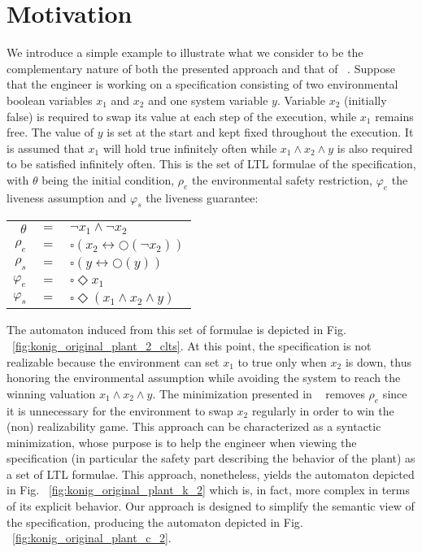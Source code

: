 \clearpage
\section{Motivation}\label{sec:motivation}

We introduce a simple example to illustrate what we consider to be the complementary nature 
of both the presented approach and that of ~\cite{DBLP:conf/hvc/KonighoferHB10}. Suppose that the engineer is working on a specification consisting of two environmental boolean variables $x_1$ and $x_2$ and one system variable $y$. Variable $x_2$ (initially false) is required to swap its value at each step of the execution, while $x_1$ remains free. The value of $y$ is set at the start and kept fixed throughout the execution.
It is assumed that $x_1$ will hold true infinitely often while $x_1 \wedge x_2 \wedge y$ is also required to be satisfied infinitely often. This is the set of LTL formulae of the specification, with $\theta$ being the initial condition, $\rho_e$ the environmental safety restriction, $\varphi_e$ the liveness assumption and $\varphi_s$ the liveness guarantee:
\begin{center}
	\begin{tabular}{ r c l }
		$\theta$& $=$ &$\neg x_1 \wedge \neg x_2$\\
		$\rho_e$& $=$ &$\square(x_2 \leftrightarrow \bigcirc(\neg x_2))$\\
		$\rho_s$& $=$ &$\square(y \leftrightarrow \bigcirc(y))$\\		
		$\varphi_e$& $=$ &$\square \Diamond x_1$\\
		$\varphi_s$& $=$ &$\square \Diamond (x_1 \wedge x_2 \wedge y)$\\
	\end{tabular}
\end{center}

The automaton induced from this set of formulae is depicted in Fig. ~\ref{fig:konig_original_plant_2_clts}. At this point, the specification is not realizable because the environment can set $x_1$ to true only when $x_2$ is down, thus honoring the environmental assumption while avoiding the system to reach the winning valuation $x_1 \wedge x_2 \wedge y$. The minimization presented in ~\cite{DBLP:conf/hvc/KonighoferHB10} removes $\rho_e$ since it is unnecessary for the environment to swap $x_2$ regularly in order to win the (non) realizability game. This approach can be characterized as a syntactic minimization, whose purpose is to help the engineer when viewing the specification (in particular the safety part describing the behavior of the plant) as a set of LTL formulae. This approach, nonetheless, yields the automaton depicted in Fig. ~\ref{fig:konig_original_plant_k_2} which is, in fact, more complex in terms of its explicit behavior. Our approach is designed to simplify the semantic view of the specification, producing the automaton depicted in Fig. ~\ref{fig:konig_original_plant_c_2}. 


